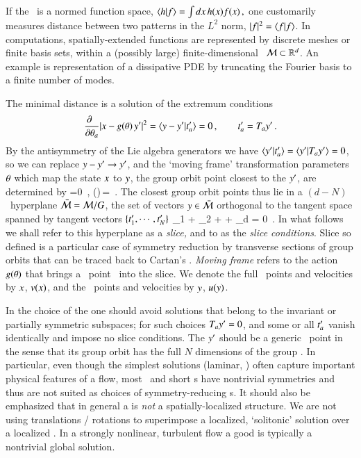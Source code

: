 \documentclass[preprint,12pt]{elsarticle} %
\begin{document}
If the \statesp\ is a normed function space,
\( %
\braket{h}{f} = \int dx \, h(x) f(x)
\,,
\) %
one customarily measures distance between two patterns in the $L^2$ norm,
$|f|^2 = \braket{f}{f}$. In computations, spatially-extended functions are
represented by discrete meshes or finite basis sets, within a (possibly
large) finite-dimensional \statesp\  ${\cal M} \subset \mathbb{R}^d$. An example
is representation of a dissipative PDE by truncating the Fourier basis
 to a finite number of modes.

The minimal distance is a solution of the extremum conditions
\[ %
\frac{\partial ~~}{\partial \gSpace_a} |\ssp - \LieEl(\gSpace)\,\slicep|^2
   =
\braket{\sspRed - \slicep}{\sliceTan{a}}
   = 0
    \,,\qquad
	  \sliceTan{a} = \Lg_a \slicep
\,.
\] %
By the antisymmetry of the Lie algebra generators we have
$\braket{\slicep}{\sliceTan{a}} = \braket{\slicep}{\Lg_{a}\slicep}=0$, so
we can replace $y - {y'} \to {\ensuremath{y'}}$, and the
`moving frame' transformation
parameters ${\bf \theta}$ which map the state $x$ to $y$, the group
orbit point closest to the {\template} ${y'}$, are determined by
\beq
{} =0
    \,,\qquad
\LieEl(\gSpace)\,\sspRed = \ssp
\,.
The closest group orbit points thus lie in a $(d\!-\!N)$\dmn\ hyperplane
$\bar{\cal M} = {\cal M}/G$, the set of vectors $y \in  \bar{\cal M}$
orthogonal to the {\template} tangent space spanned by tangent vectors
$\{t'_{1},\cdots,t'_{N}\}$
\beq
\sspRed_1 + \sspRed_2
  + \cdots + \sspRed_d = 0
\,.
In what follows we shall refer to this hyperplane as a \emph{slice,} and
to   as the \emph{slice conditions}. Slice so defined is
a particular case of symmetry reduction by transverse sections of group
orbits that can be traced back to
Cartan's \mframes{}. \emph{Moving frame} refers to the action
$g({\bf \theta})$ that brings a \statesp\ point \ssp\ into the slice.
We denote the full \statesp\ points and velocities by $x$,
$v(x)$, and the \reducedsp\  points and velocities by $y$,
$u(y)$.

In the choice of the {\template} one should avoid solutions
that belong to the invariant or partially symmetric subspaces; for such
choices $T_{a}{y'}=0$, and some or all $t'_{a}$ vanish identically
and impose no slice conditions. The {\template} ${y'}$ should be a
generic \statesp\ point in the sense that its group orbit has the full
$N$ dimensions of the group \Group. In particular, even though the
simplest solutions (laminar, \etc) often capture important physical
features of a flow, most \eqva\ and short \po s have nontrivial
symmetries and thus are not suited as choices of symmetry-reducing
{\template s}.
It should also be emphasized that in general a {\template} is \emph{not}
a spatially-{localized} structure. We are not using translations /
rotations to superimpose a localized, `solitonic' solution over a
localized {\template}. In a strongly nonlinear, turbulent flow a good
{\template} is typically a nontrivial global solution.
\end{document}
